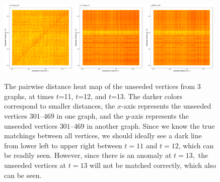 \documentclass[12pt]{article}
\numberwithin{equation}{section}
\theoremstyle{definition}
\begin{document}



\begin{figure}[h]
\centering
\includegraphics[width=0.32\textwidth]{fig6a_11v12.pdf}
\includegraphics[width=0.32\textwidth]{fig6b_11v13.pdf}
\includegraphics[width=0.32\textwidth]{fig6c_12v13.pdf}
\caption{The pairwise distance heat map of the unseeded vertices from 3
    graphs, at times $t$=11, $t$=12, and $t$=13. The darker colors
    correspond to smaller distances, the $x$-axis represents the
    unseeded vertices $301$--$469$ in one graph, and the $y$-axis
    represents the unseeded vertices $301$--$469$ in another graph. 
    Since we know the true matchings between all vertices, 
    we should ideally see a dark line
    from lower left to upper right between $t=11$ and $t=12$, which can
    be readily seen. However, since there is an anomaly at $t=13,$ the
    unseeded vertices at $t=13$ will not be matched correctly, which
    also can be seen.}
\label{fig:fig6}
\end{figure}
\end{document}
